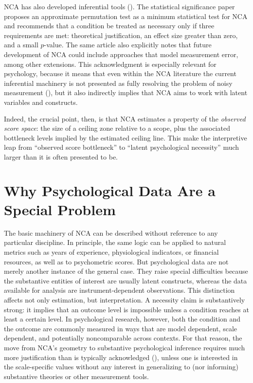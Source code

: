 \documentclass[
  man,
  longtable,
  nolmodern,
  notxfonts,
  notimes,
  colorlinks=true,linkcolor=blue,citecolor=blue,urlcolor=blue]{apa7}
\begin{document}
NCA has also developed inferential tools
().
The statistical significance paper proposes an approximate permutation
test as a minimum statistical test for NCA and recommends that a
condition be treated as necessary only if three requirements are met:
theoretical justification, an effect size greater than zero, and a small
\(p\)-value. The same article also explicitly notes that future
development of NCA could include approaches that model measurement
error, among other extensions. This acknowledgment is especially
relevant for psychology, because it means that even within the NCA
literature the current inferential machinery is not presented as fully
resolving the problem of noisy measurement
(),
but it also indirectly implies that NCA aims to work with latent
variables and constructs.

Indeed, the crucial point, then, is that NCA estimates a property of the
\emph{observed score space}: the size of a ceiling zone relative to a
scope, plus the associated bottleneck levels implied by the estimated
ceiling line. This make the interpretive leap from ``observed score
bottleneck'' to ``latent psychological necessity'' much larger than it
is often presented to be.

\section{Why Psychological Data Are a Special
Problem}\label{why-psychological-data-are-a-special-problem}

The basic machinery of NCA can be described without reference to any
particular discipline. In principle, the same logic can be applied to
natural metrics such as years of experience, physiological indicators,
or financial resources, as well as to psychometric scores. But
psychological data are not merely another instance of the general case.
They raise special difficulties because the substantive entities of
interest are usually latent constructs, whereas the data available for
analysis are instrument-dependent observations. This distinction affects
not only estimation, but interpretation. A necessity claim is
substantively strong: it implies that an outcome level is impossible
unless a condition reaches at least a certain level. In psychological
research, however, both the condition and the outcome are commonly
measured in ways that are model dependent, scale dependent, and
potentially noncomparable across contexts. For that reason, the move
from NCA's geometry to substantive psychological inference requires much
more justification than is typically acknowledged
(), unless one is interested in the scale-specific values without
any interest in generalizing to (nor informing) substantive theories or
other measurement tools.
\end{document}
